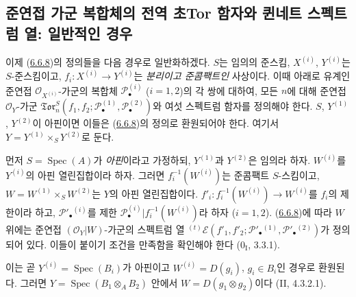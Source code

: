 \subsection{준연접 가군 복합체의 전역 초Tor 함자와 퀸네트 스펙트럼 열:
일반적인 경우}

\begin{env}[6.7.1]
\label{III.6.7.1-fr}
이제 (\hyperref[III.6.6.8-fr]{6.6.8})의 정의들을 다음 경우로
일반화하겠다. $S$는 임의의 준스킴, $X^{(i)}$, $Y^{(i)}$는
$S$-준스킴이고, $f_i:X^{(i)}\to Y^{(i)}$는 \emph{분리이고
준콤팩트인} 사상이다. 이때 아래로 유계인 준연접
$\mathscr O_{X^{(i)}}$-가군의 복합체 $\mathscr P_\bullet^{(i)}$
($i=1,2$)의 각 쌍에 대하여, 모든 $n$에 대해 준연접
$\mathscr O_Y$-가군
$\mathfrak{Tor}_n^S
(f_1,f_2;\mathscr P_\bullet^{(1)},\mathscr P_\bullet^{(2)})$와 여섯
스펙트럼 함자를 정의해야 한다. $S$, $Y^{(1)}$, $Y^{(2)}$이
아핀이면 이들은 (\hyperref[III.6.6.8-fr]{6.6.8})의 정의로
환원되어야 한다. 여기서 $Y=Y^{(1)}\times_S Y^{(2)}$로 둔다.

먼저 $S=\operatorname{Spec}(A)$가 \emph{아핀}이라고 가정하되,
$Y^{(1)}$과 $Y^{(2)}$은 임의라 하자. $W^{(i)}$를 $Y^{(i)}$의
아핀 열린집합이라 하자. 그러면 $f_i^{-1}(W^{(i)})$는 준콤팩트
$S$-스킴이고, $W=W^{(1)}\times_S W^{(2)}$는 $Y$의 아핀
열린집합이다. $f'_i:f_i^{-1}(W^{(i)})\to W^{(i)}$를 $f_i$의
제한이라 하고, $\mathscr P'_\bullet{}^{(i)}$를 제한
$\mathscr P_\bullet^{(i)}|f_i^{-1}(W^{(i)})$라 하자 ($i=1,2$).
(\hyperref[III.6.6.8-fr]{6.6.8})에 따라 $W$ 위에는 준연접
$(\mathscr O_Y|W)$-가군의 스펙트럼 열
${}^{(t)}\mathscr E
(f'_1,f'_2;\mathscr P'_\bullet{}^{(1)},\mathscr P'_\bullet{}^{(2)})$가
정의되어 있다. 이들이 붙이기 조건을 만족함을 확인해야 한다
($0_{\mathrm I}$, 3.3.1).

이는 곧 $Y^{(i)}=\operatorname{Spec}(B_i)$가 아핀이고
$W^{(i)}=D(g_i)$, $g_i\in B_i$인 경우로 환원된다. 그러면
$Y=\operatorname{Spec}(B_1\otimes_A B_2)$ 안에서
$W=D(g_1\otimes g_2)$이다 (II, 4.3.2.1).



\end{env}
